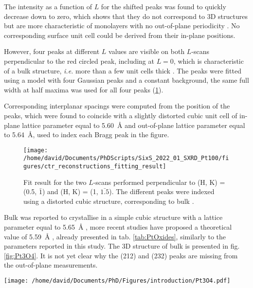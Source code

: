 The intensity as a function of $L$ for the shifted peaks was found to quickly decrease down to zero, which shows that they do not correspond to 3D structures but are more characteristic of monolayers with no out-of-plane periodicity \parencite{Robinson1991}.
No corresponding surface unit cell could be derived from their in-plane positions.

However, four peaks at different $L$ values are visible on both $L$-scans perpendicular to the red circled peak, including at $L=0$, which is characteristic of a bulk structure, \textit{i.e.} more than a few unit cells thick \parencite{Robinson1991}.
The peaks were fitted using a model with four Gaussian peaks and a constant background, the same full width at half maxima was used for all four peaks (\ref{fig:FitPt100LScans}).

Corresponding interplanar spacings were computed from the position of the peaks, which were found to coincide with a slightly distorted cubic unit cell of in-plane lattice parameter equal to \qty{5.60}{\angstrom} and out-of-plane lattice parameter equal to \qty{5.64}{\angstrom}, used to index each Bragg peak in the figure.

\begin{figure}[!htb]
    \centering
    \texttt{[image: /home/david/Documents/PhDScripts/SixS\_2022\_01\_SXRD\_Pt100/figures/ctr\_reconstructions\_fitting\_result]}
    \caption{
        Fit result for the two $L$-scans performed perpendicular to (H, K) = (0.5, $\bar{1}$) and (H, K) = (1, $\bar{1.5}$).
        The different peaks were indexed using a distorted cubic structure, corresponding to bulk .
    }
    \label{fig:FitPt100LScans}
\end{figure}

Bulk  was reported to crystallise in a simple cubic structure with a lattice parameter equal to \qty{5.65}{\angstrom} \parencite{Galloni1941, Galloni1952, MULLER1968}, more recent studies have proposed a theoretical value of \qty{5.59}{\angstrom} \parencite{Seriani2006}, already presented in tab. \ref{tab:PtOxides}, similarly to the parameters reported in this study.
The 3D structure of bulk  is presented in fig. \ref{fig:Pt3O4}.
It is not yet clear why the (212) and (232) peaks are missing from the out-of-plane measurements.

\begin{SCfigure}
    \centering
    \texttt{[image: /home/david/Documents/PhD/Figures/introduction/Pt3O4.pdf]}
    \caption{
         bulk unit cell.
        Platinum atoms are situated on the faces on the cubic unit cell (e.g. $(0, 1/2, 1/4)$, $(0, 1/2, 3/4)$), while the eight oxygen atoms are inside the unit cell at the positions $(1/4, 1/4, z)$, $(1/4, 2/4, z)$, $(2/4, 1/4, z)$, $(2/4, 2/4, z)$ for $z=1/4$ and $z=3/4$.
    }
    \label{fig:Pt3O4}
\end{SCfigure}

